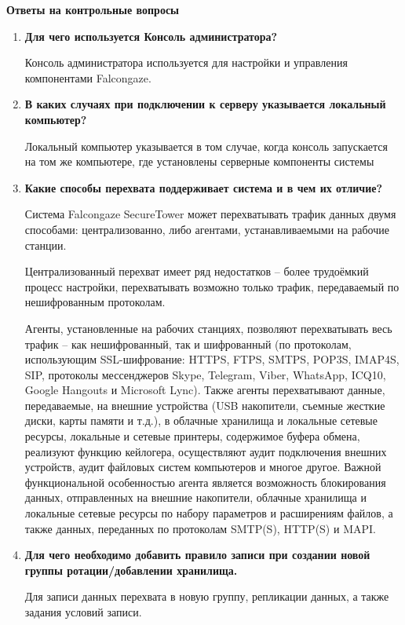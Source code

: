 \documentclass[a4paper,14pt]{extarticle}
\begin{document}
    \textbf{Ответы на контрольные вопросы}
    \begin{enumerate}
        \item \textbf{Для чего используется Консоль администратора?} \par
        \qquad Консоль администратора используется для настройки и управления
        компонентами Falcongaze.  
        \item \textbf{В каких случаях при подключении к серверу указывается локальный компьютер?} \par
        \qquad Локальный компьютер указывается в том случае, когда консоль запускается на том же 
        компьютере, где установлены серверные компоненты системы
        \item \textbf{Какие способы перехвата поддерживает система и в чем их отличие?}\par
        \qquad Система Falcongaze SecureTower может перехватывать трафик данных двумя способами: централизованно, либо агентами, устанавливаемыми на рабочие станции.\par
        \qquad Централизованный перехват имеет ряд недостатков – более трудоёмкий процесс настройки, перехватывать возможно только трафик, передаваемый по нешифрованным протоколам. \par
        \qquad Агенты, установленные на рабочих станциях, позволяют перехватывать весь трафик – как нешифрованный, так и шифрованный (по протоколам, использующим SSL-шифрование: HTTPS, FTPS, SMTPS, POP3S, IMAP4S, SIP, протоколы мессенджеров Skype, Telegram, Viber, WhatsApp, ICQ10, Google Hangouts и Microsoft Lync). Также агенты перехватывают данные, передаваемые, на внешние устройства (USB накопители, съемные жесткие диски, карты памяти и т.д.), в облачные хранилища и локальные сетевые ресурсы, локальные и сетевые принтеры, содержимое буфера обмена, реализуют функцию кейлогера, осуществляют аудит подключения внешних устройств, аудит файловых систем компьютеров и многое другое. Важной функциональной особенностью агента является возможность блокирования данных, отправленных на внешние накопители, облачные хранилища и локальные сетевые ресурсы по набору параметров и расширениям файлов, а также данных, переданных по протоколам SMTP(S), HTTP(S) и MAPI.
        \item \textbf{Для чего необходимо добавить правило записи при создании новой группы ротации/добавлении хранилища.} \par
        \qquad Для записи данных перехвата в новую группу, репликации данных, а также задания условий записи.

\end{enumerate}
\end{document}
